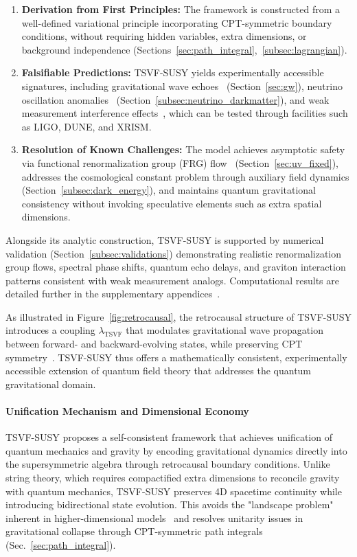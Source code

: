 \documentclass[twocolumn,superscriptaddress,floatfix]{revtex4-2}
\begin{document}
\begin{enumerate}
  \item \textbf{Derivation from First Principles:}  
  The framework is constructed from a well-defined variational principle incorporating CPT-symmetric boundary conditions, without requiring hidden variables, extra dimensions, or background independence (Sections~\ref{sec:path_integral},~\ref{subsec:lagrangian}).

  \item \textbf{Falsifiable Predictions:}  
  TSVF-SUSY yields experimentally accessible signatures, including gravitational wave echoes~\cite{Abedi2017,tsvf-susy-gw} (Section~\ref{sec:gw}), neutrino oscillation anomalies~\cite{T2K2019,tsvf-susy-neutrinos} (Section~\ref{subsec:neutrino_darkmatter}), and weak measurement interference effects~\cite{Danan2013,tsvf-susy-weak}, which can be tested through facilities such as LIGO, DUNE, and XRISM.

  \item \textbf{Resolution of Known Challenges:}  
  The model achieves asymptotic safety via functional renormalization group (FRG) flow~\cite{Reuter1998} (Section~\ref{sec:uv_fixed}), addresses the cosmological constant problem through auxiliary field dynamics (Section~\ref{subsec:dark_energy}), and maintains quantum gravitational consistency without invoking speculative elements such as extra spatial dimensions.
\end{enumerate}

Alongside its analytic construction, TSVF-SUSY is supported by numerical validation (Section~\ref{subsec:validations}) demonstrating realistic renormalization group flows, spectral phase shifts, quantum echo delays, and graviton interaction patterns consistent with weak measurement analogs. Computational results are detailed further in the supplementary appendices~\cite{tsvf-susy-gw,tsvf-susy-darkenergy}.

As illustrated in Figure~\ref{fig:retrocausal}, the retrocausal structure of TSVF-SUSY introduces a coupling \(\lambda_{\text{TSVF}}\) that modulates gravitational wave propagation between forward- and backward-evolving states, while preserving CPT symmetry~\cite{Greenberg2002}. TSVF-SUSY thus offers a mathematically consistent, experimentally accessible extension of quantum field theory that addresses the quantum gravitational domain.

\paragraph{Unification Mechanism and Dimensional Economy}  
TSVF-SUSY proposes a self-consistent framework that achieves unification of quantum mechanics and gravity by encoding gravitational dynamics directly into the supersymmetric algebra through retrocausal boundary conditions. Unlike string theory, which requires compactified extra dimensions to reconcile gravity with quantum mechanics, TSVF-SUSY preserves 4D spacetime continuity while introducing bidirectional state evolution. This avoids the "landscape problem" inherent in higher-dimensional models~\cite{Susskind2003} and resolves unitarity issues in gravitational collapse through CPT-symmetric path integrals (Sec.~\ref{sec:path_integral}).
\end{document}
